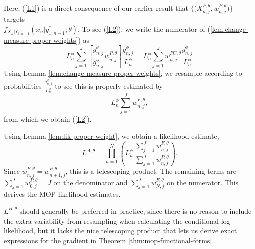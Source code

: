 Here, (\ref{L1}) is a direct consequence of our earlier result that $\{ \big(X^{P,\theta}_{n,j},w^{P,\theta}_{n,j}\big) \}$ targets\\
$f_{X_{n}|Y_{1:n-1}}(x_{n}|y^*_{1:n-1};\theta)$.
To see  (\ref{L2}),
we write the numerator of (\ref{lem:change-measure-proper-weights}) as
\begin{equation}
L^\phi_n \sum_{j=1}^J \left[ \frac{g^\theta_{n,j}}{g^\phi_{n,j}} w^{P,\theta}_{n,j}\right] \frac{g^\phi_{n,j}}{L_n^\phi}
= L^\phi_n \sum_{j=1}^J w_{n,j}^{FC,\theta} \frac{g^\phi_{n,j}}{L_n^\phi}
\end{equation}
Using Lemma \ref{lem:change-measure-proper-weights}, we resample according to probabilities $\frac{g^\phi_{n,j}}{L_n^\phi}$ to see this is properly estimated by
\begin{equation}
L^\phi_n \sum_{j=1}^J w^{F,\theta}_{n,j},
\end{equation}
from which we obtain (\ref{L2}).

Using Lemma \ref{lem:lik-proper-weight}, we obtain a likelihood estimate,
\begin{equation}
L^{A,\theta} = \prod_{n=1}^N \left( L^\phi_n \, \frac{\sum_{j=1}^J w^{F,\theta}_{n,j}}{\sum_{j=1}^J w^{P,\theta}_{n,j}}\right).
\end{equation}
Since $w^{F,\theta}_{n,j}=w^{P,\theta}_{n+1,j}$, this is a telescoping product. The remaining terms are
$\sum_{j=1}^J w^{P,\theta}_{0,j} = J$ on the denominator and $\sum_{j=1}^J w^{F,\theta}_{N,j}$ on the numerator.
This derives the MOP likelihood estimates.


$L^{B,\theta}$ should generally be preferred in practice, since there is no reason to include the extra variability from resampling when calculating the conditional log likelihood, but it lacks the nice telescoping product that lets us derive exact expressions for the gradient in Theorem \ref{thm:mop-functional-forms}.
